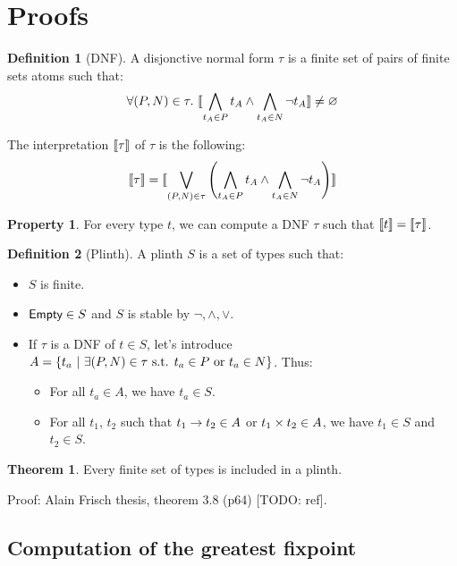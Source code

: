 \documentclass[a4paper]{article}
\theoremstyle{definition}
\newtheorem{theorem}{Theorem}
\newtheorem{definition}{Definition}
\newtheorem{property}{Property}
\begin{document}
    \section{Proofs}

    \begin{definition}[DNF]
      A disjonctive normal form $\tau$ is a finite set of pairs of finite sets atoms such that:
      \[ \forall (P,N)\in \tau.\ {\llbracket \bigwedge_{t_A \in P} t_A \land \bigwedge_{t_A \in N} \neg t_A \rrbracket} \neq \varnothing \]

      The interpretation ${\llbracket \tau \rrbracket}$ of $\tau$ is the following:
      \[
        {\llbracket \tau \rrbracket} = {\llbracket \bigvee_{(P,N)\in \tau} \left(\bigwedge_{t_A \in P} t_A \land \bigwedge_{t_A \in N} \neg t_A \right) \rrbracket}
      \]
    \end{definition}

    \begin{property}
      For every type $t$, we can compute a DNF $\tau$ such that ${\llbracket t \rrbracket} = {\llbracket \tau \rrbracket}$.
    \end{property}

    \begin{definition}[Plinth]
      A plinth $S$ is a set of types such that:
      \begin{itemize}
        \item $S$ is finite.
        \item $\textsf{Empty} \in S$ and $S$ is stable by $\neg, \land, \vee$. 
        \item If $\tau$ is a DNF of $t\in S$, let's introduce $A=\{t_a ~|~ \exists (P,N) \in \tau \text{ s.t. } t_a \in P \text{ or } t_a \in N \}$. Thus:
        \begin{itemize}
          \item For all $t_a \in A$, we have $t_a \in S$.
          \item For all $t_1$, $t_2$ such that $t_1\to t_2 \in A$ or $t_1\times t_2 \in A$,
          we have $t_1 \in S$ and $t_2 \in S$.
        \end{itemize}
      \end{itemize}
    \end{definition}

    \begin{theorem}
      Every finite set of types is included in a plinth.
    \end{theorem}

    Proof: Alain Frisch thesis, theorem 3.8 (p64) [TODO: ref].

    \subsection{Computation of the greatest fixpoint}
\end{document}

